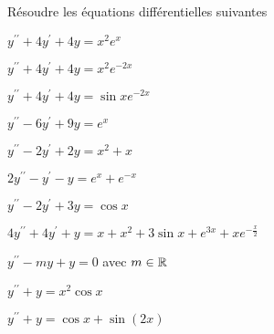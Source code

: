 \documentclass[a4paper, 11pt,reqno]{article}
\begin{document}
\begin{exercice}  \;
R\'esoudre les \'equations diff\'erentielles suivantes
\begin{enumerate}
\begin{minipage}[c]{0.45\linewidth}
\item $y^{\prime\prime}+4y^{\prime}+4y=x^2e^x$
\item $y^{\prime\prime}+4y^{\prime}+4y=x^2e^{-2x}$
\item $y^{\prime\prime}+4y^{\prime}+4y=\sin{x}e^{-2x}$
\item $y^{\prime\prime}-6y^{\prime}+9y=e^x$
\item $y^{\prime\prime}-2y^{\prime}+2y=x^2+x$
\item $2y^{\prime\prime}-y^{\prime}-y=e^x+e^{-x}$
\end{minipage}
\begin{minipage}[c]{0.45\linewidth}
\item $y^{\prime\prime}-2y^{\prime}+3y=\cos{x}$
\item $4y^{\prime\prime}+4y^{\prime}+y=x+x^2+3\sin{x}+e^{3x}+xe^{-\frac{x}{2}}$
\item $y^{\prime\prime}-my+y=0$ avec $m\in\mathbb{R}$
\item $y^{\prime\prime}+y=x^2\cos{x}$
\item $y^{\prime\prime}+y=\cos{x}+\sin{(2x)}$
\end{minipage}
\end{enumerate}
\end{exercice}
\end{document}
